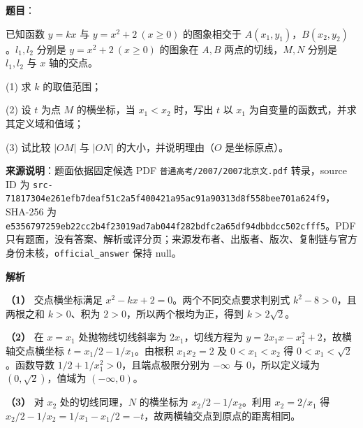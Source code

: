 \begin{answer}

\textbf{题目}：

已知函数 $y=kx$ 与 $y=x^2+2\ (x\geq 0)$ 的图象相交于 $A(x_1,y_1)$，$B(x_2,y_2)$。$l_1,l_2$ 分别是 $y=x^2+2\ (x\geq 0)$ 的图象在 $A,B$ 两点的切线，$M,N$ 分别是 $l_1,l_2$ 与 $x$ 轴的交点。

(1) 求 $k$ 的取值范围；

(2) 设 $t$ 为点 $M$ 的横坐标，当 $x_1<x_2$ 时，写出 $t$ 以 $x_1$ 为自变量的函数式，并求其定义域和值域；

(3) 试比较 $|OM|$ 与 $|ON|$ 的大小，并说明理由（$O$ 是坐标原点）。

\begin{gktip}
\textbf{来源说明}：题面依据固定候选 PDF \texttt{普通高考/2007/2007北京文.pdf} 转录，source ID 为 \texttt{src-71817304e261efb7deaf51c2a5f400421a95ac91a90313d8f558bee701a624f9}，SHA-256 为 \texttt{e5356797259eb22cc2b4f23019ad7ab044f282bdfc2a65df94dbbdcc502cfff5}。PDF 只有题面，没有答案、解析或评分页；来源发布者、出版者、版次、复制链与官方身份未核，\texttt{official_answer} 保持 null。
\end{gktip}

\textbf{解析}

\textbf{（1）} 交点横坐标满足 $x^2-kx+2=0$。两个不同交点要求判别式 $k^2-8>0$，且两根之和 $k>0$、积为 $2>0$，所以两个根均为正，得到 $k>2\sqrt2$。

\textbf{（2）} 在 $x=x_1$ 处抛物线切线斜率为 $2x_1$，切线方程为 $y=2x_1x-x_1^2+2$，故横轴交点横坐标 $t=x_1/2-1/x_1$。由根积 $x_1x_2=2$ 及 $0<x_1<x_2$ 得 $0<x_1<\sqrt2$。函数导数 $1/2+1/x_1^2>0$，且端点极限分别为 $-\infty$ 与 $0$，所以定义域为 $(0,\sqrt2)$，值域为 $(-\infty,0)$。

\textbf{（3）} 对 $x_2$ 处的切线同理，$N$ 的横坐标为 $x_2/2-1/x_2$。利用 $x_2=2/x_1$ 得 $x_2/2-1/x_2=1/x_1-x_1/2=-t$，故两横轴交点到原点的距离相同。




\end{answer}